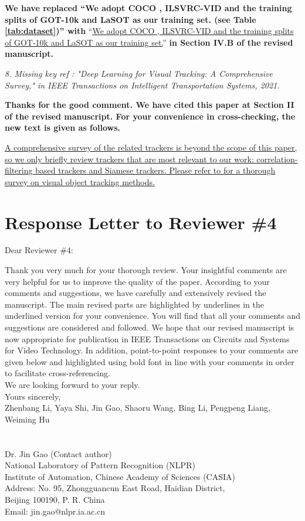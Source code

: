 \documentclass[12pt]{article}
\begin{document}
\textbf{We have replaced ``We adopt COCO \cite{COCO}, ILSVRC-VID \cite{VID} and the training splits of GOT-10k \cite{GOT-10k} and LaSOT \cite{LaSOT} as our training set. (see Table \ref{tab:dataset})'' with}
``\uline{We adopt COCO \cite{COCO}, ILSVRC-VID \cite{VID} and the training splits of GOT-10k \cite{GOT-10k} and LaSOT \cite{LaSOT} as our training set.}''
\textbf{in Section IV.B of the revised manuscript.}

\textit{8. Missing key ref : "Deep Learning for Visual Tracking: A Comprehensive Survey," in IEEE Transactions on Intelligent Transportation Systems, 2021.}

\textbf{Thanks for the good comment. We have cited this paper at Section II of the revised manuscript.  For your convenience in cross-checking, the new text is given as follows.}

\uline{A comprehensive survey of the related trackers is beyond the scope of this paper, so we only briefly review trackers that are most relevant to our work: correlation-filtering based trackers and Siamese trackers. Please refer to \cite{9339950} for a thorough survey on visual object tracking methods.}

\clearpage
\newpage
{\centering\section*{Response Letter to Reviewer \#4}}
\noindent Dear Reviewer \#4:

Thank you very much for your thorough review. Your insightful comments are very helpful for us to improve the quality of the paper. According to your comments and suggestions, we have carefully and extensively revised the manuscript. The main revised parts are highlighted by underlines in the underlined version for your convenience. You will find that all your comments and suggestions are considered and followed. We hope that our revised manuscript is now appropriate for publication in IEEE Transactions on Circuits and Systems for Video Technology.
In addition, point-to-point responses to your comments are given below and highlighted using bold font in line with your comments in order to facilitate cross-referencing.\\[10pt]
\indent We are looking forward to your reply.\\[10pt]
\noindent Yours sincerely,\\
\noindent Zhenbang Li, Yaya Shi, Jin Gao, Shaoru Wang, Bing Li, Pengpeng Liang, Weiming Hu
\\
\\
\\
\noindent Dr. Jin Gao (Contact author)\\
\noindent National Laboratory of Pattern Recognition (NLPR)\\
\noindent Institute of Automation, Chinese Academy of Sciences (CASIA)\\
\noindent Address: No. 95, Zhongguancun East Road, Haidian District,\\
\noindent Beijing 100190, P. R. China\\
\noindent Email: jin.gao@nlpr.ia.ac.cn
\end{document}
